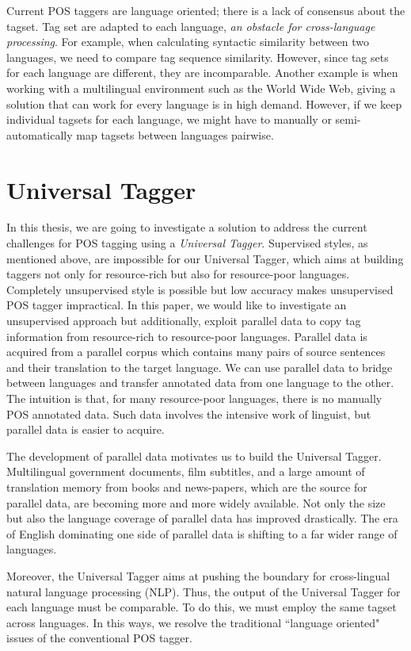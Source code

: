 Current POS taggers are language oriented; there is a lack of consensus about the tagset. Tag set are adapted to each language, \textit{ an obstacle for cross-language processing}. For example, when calculating syntactic similarity between two languages, we need to compare tag sequence similarity. However, since tag sets for each language are different, they are incomparable. Another example is when working with a multilingual environment such as the World Wide Web, giving a solution that can work for every language is in high demand. However, if we keep individual tagsets for each language, we might have to manually or semi-automatically map tagsets between languages pairwise.  

\section{Universal Tagger}
In this thesis, we are going to investigate a solution to address the current challenges for POS tagging using a \emph{Universal Tagger}. Supervised styles, as mentioned above, are impossible for our Universal Tagger, which aims at building taggers not only for resource-rich but also for resource-poor languages. Completely unsupervised style is possible but low accuracy makes unsupervised POS tagger impractical. In this paper, we would like to investigate an unsupervised approach but additionally, exploit parallel data to copy tag information from resource-rich to resource-poor languages. Parallel data is acquired from a parallel corpus which contains many pairs of source sentences and their translation to the target language. We can use parallel data to bridge between languages and transfer annotated data from one language to the other. The intuition is that, for many resource-poor languages, there is no manually POS annotated data. Such data involves the intensive work of linguist, but parallel data is easier to acquire. 

The development of parallel data motivates us to build the Universal Tagger. Multilingual government documents, film subtitles, and a large amount of translation memory from books and news-papers, which are the source for parallel data, are becoming more and more widely available. Not only the size but also the language coverage of parallel data has improved drastically. The era of English dominating one side of parallel data is shifting to a far wider range of languages. 

Moreover, the Universal Tagger aims at pushing the boundary for cross-lingual natural language processing (NLP). Thus, the output of the Universal Tagger for each language must be comparable. To do this, we must employ the same tagset across languages. In this ways, we resolve the traditional ``language oriented" issues of the conventional POS tagger. 

